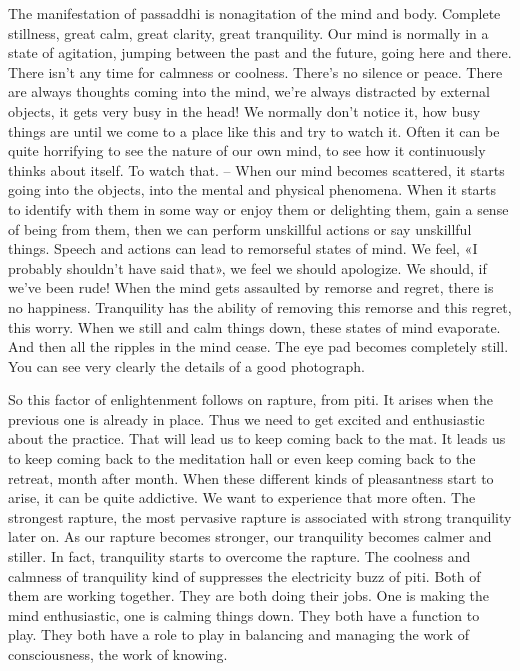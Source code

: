 \documentclass[letterpaper,10pt,english]{sphinxmanual}
\begin{document}
\sphinxAtStartPar
The manifestation of passaddhi is non\sphinxhyphen{}agitation of the mind and body.
Complete stillness, great calm, great clarity, great tranquility. Our mind is
normally  in  a  state  of  agitation,  jumping  between  the  past  and  the  future,
going here and there. There isn’t any time for calmness or coolness. There’s
no silence or peace. There are always thoughts coming into the mind, we’re
always distracted by external objects, it gets very busy in the head! We normally  don’t  notice  it,  how  busy  things  are  until  we  come  to  a  place  like
this  and  try  to  watch  it.  Often  it  can  be  quite  horrifying  to  see  the  nature
of our own mind, to see how it continuously thinks about itself. To watch
that.  – When  our  mind  becomes  scattered,  it  starts  going  into  the  objects,
into  the  mental  and  physical  phenomena.  When  it  starts  to  identify  with
them in some way or enjoy them or delighting them, gain a sense of being
from them, then we can perform unskillful actions or say unskillful things.
Speech and actions can lead to remorseful states of mind. We feel, «I probably shouldn’t have said that», we feel we should apologize. We should, if
we’ve been rude! When the mind gets assaulted by remorse and regret, there
is no happiness. Tranquility has the ability of removing this remorse and this
regret, this worry. When we still and calm things down, these states of mind
evaporate. And then all the ripples in the mind cease. The eye pad becomes
completely still. You can see very clearly the details of a good photograph.

\sphinxAtStartPar
{}  So this factor of enlightenment follows on rapture, from piti. It arises
when the previous one is already in place. Thus we need to get excited and
enthusiastic  about  the  practice.  That  will  lead  us  to  keep  coming  back  to
the mat. It leads us to keep coming back to the meditation hall or even keep
coming back to the retreat, month after month. When these different kinds of
pleasantness start to arise, it can be quite addictive. We want to experience
that more often. The strongest rapture, the most pervasive rapture is associated with strong tranquility later on. As our rapture becomes stronger, our
tranquility becomes calmer and stiller. In fact, tranquility starts to overcome
the rapture. The coolness and calmness of tranquility kind of suppresses the
electricity  buzz  of  piti.  Both  of  them  are  working  together. They  are  both
doing their jobs. One is making the mind enthusiastic, one is calming things
down. They both have a function to play. They both have a role to play in
balancing and managing the work of consciousness, the work of knowing.
\end{document}
